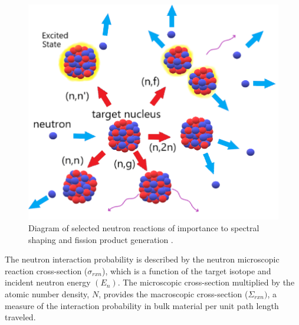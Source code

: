 \begin{figure}[ht]
	\includegraphics[width=\linewidth]{Figures/Chapter2/NeutronThings.png}
	\caption[Diagram of selected neutron reactions of importance to spectral shaping and fission product generation.]{Diagram of selected neutron reactions of importance to spectral shaping and fission product generation \cite{Greenwood2013}.}
	\label{fig:rxns}
\end{figure}

The neutron interaction probability is described by the neutron microscopic reaction cross-section ($\sigma_{rxn}$), which is a function of the target isotope and incident neutron energy $(E_{n})$.  
The microscopic cross-section multiplied by the atomic number density, $N$, provides the macroscopic cross-section ($\Sigma_{rxn})$, a measure of the interaction probability in bulk material per unit path length traveled. 


